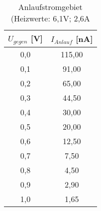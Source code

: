 \begin{table}[h]
	\begin{center}
		\begin{tabular}{cc}
			$U_{gegen}$ [V]&$I_{Anlauf}$ [nA] \\ \hline
			0,0&115,00\\
			0,1&91,00\\
			0,2&65,00\\
			0,3&44,50\\
			0,4&30,00\\
			0,5&20,00\\
			0,6&12,50\\
			0,7&7,50\\
			0,8&4,50\\
			0,9&2,90\\
			1,0&1,65
		\end{tabular}
		\caption{Anlaufstromgebiet (Heizwerte: 6,1V; 2,6A}
		\label{tabcdata}
	\end{center}
\end{table}